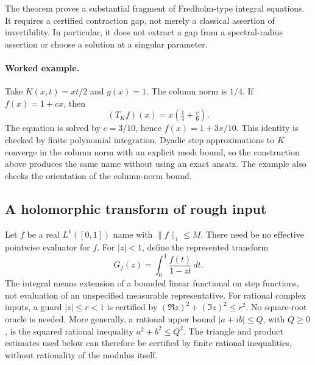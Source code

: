 The theorem proves a substantial fragment of Fredholm-type integral
equations. It requires a certified contraction gap, not merely a
classical assertion of invertibility. In particular, it does not
extract a gap from a spectral-radius assertion or choose a solution at
a singular parameter.

\paragraph{Worked example.}
Take \(K(x,t)=xt/2\) and \(g(x)=1\). The column norm is \(1/4\).
If \(f(x)=1+cx\), then
\[
 (T_Kf)(x)=x\left(\tfrac14+\tfrac c6\right).
\]
The equation is solved by \(c=3/10\), hence
\(f(x)=1+3x/10\). This identity is checked by finite polynomial
integration. Dyadic step approximations to \(K\) converge in the
column norm with an explicit mesh bound, so the construction above
produces the same name without using an exact ansatz. The example
also checks the orientation of the column-norm bound.

\subsection{A holomorphic transform of rough input}

Let \(f\) be a real \(L^1([0,1])\) name with
\(\|f\|_1\leq M\). There need be no effective pointwise evaluator for
\(f\). For \(|z|<1\), define the represented transform
\[
 G_f(z)=\int_0^1\frac{f(t)}{1-zt}\,dt.
 \tag{G}\label{eq:analytic-transform}
\]
The integral means extension of a bounded linear functional on step
functions, not evaluation of an unspecified measurable representative.
For rational complex inputs, a guard \(|z|\leq r<1\) is certified by
\((\Re z)^2+(\Im z)^2\leq r^2\). No square-root oracle is needed.
More generally, a rational upper bound \(|a+ib|\leq Q\), with
\(Q\geq0\), is the squared rational inequality \(a^2+b^2\leq Q^2\).
The triangle and product estimates used below can therefore be certified
by finite rational inequalities, without rationality of the modulus
itself.

